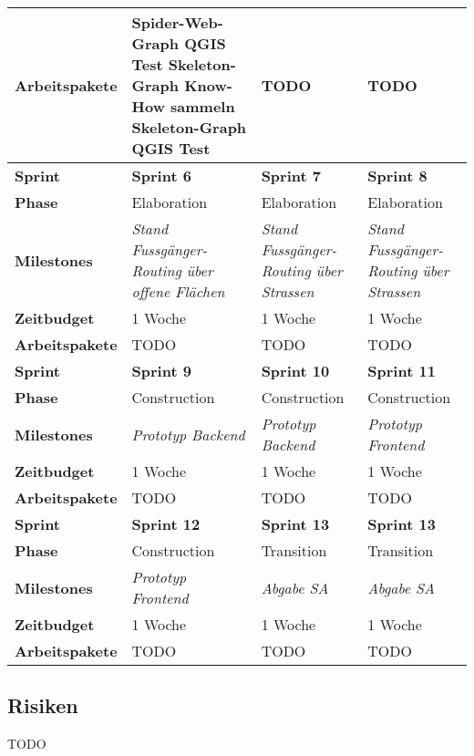 \begin{table}[]
\begin{tabularx}{\textwidth}{lXXX}
		\textbf{Arbeitspakete} & \nextitem Spider-Web-Graph QGIS Test \nextitem Skeleton-Graph Know-How sammeln \nextitem Skeleton-Graph QGIS Test              & TODO              & TODO                                    \\ \bottomrule
		\toprule
		\textbf{Sprint}        & \textbf{Sprint 6} & \textbf{Sprint 7} & \textbf{Sprint 8} \\ \midrule
		\textbf{Phase}         & Elaboration         & Elaboration         & Elaboration \\
		\textbf{Milestones}    & \textit{Stand Fussgänger-Routing über offene Flächen}  & \textit{Stand Fussgänger-Routing über Strassen}  & \textit{Stand Fussgänger-Routing über Strassen} \\
		\textbf{Zeitbudget}    & 1 Woche           & 1 Woche           & 1 Woche                                 \\
		\textbf{Arbeitspakete} & TODO              & TODO              & TODO                                    \\ \bottomrule
		\toprule
		\textbf{Sprint}        & \textbf{Sprint 9} & \textbf{Sprint 10} & \textbf{Sprint 11} \\ \midrule
		\textbf{Phase}         & Construction         & Construction         & Construction \\
		\textbf{Milestones}    & \textit{Prototyp Backend}  & \textit{Prototyp Backend}  & \textit{Prototyp Frontend} \\
		\textbf{Zeitbudget}    & 1 Woche           & 1 Woche           & 1 Woche                                 \\
		\textbf{Arbeitspakete} & TODO              & TODO              & TODO                                    \\ \bottomrule
		\toprule
		\textbf{Sprint}        & \textbf{Sprint 12} & \textbf{Sprint 13} & \textbf{Sprint 13} \\ \midrule
		\textbf{Phase}         & Construction         & Transition         & Transition \\
		\textbf{Milestones}    & \textit{Prototyp Frontend}  & \textit{Abgabe SA}  & \textit{Abgabe SA} \\
		\textbf{Zeitbudget}    & 1 Woche           & 1 Woche           & 1 Woche                                 \\
		\textbf{Arbeitspakete} & TODO             & TODO              & TODO                                    \\ \bottomrule
	\end{tabularx}
\end{table}


\subsection{Risiken}
\label{sub:Risiken}

TODO